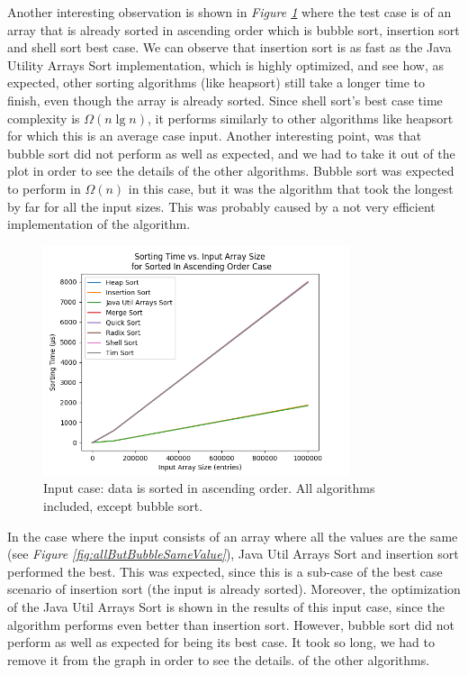 Another interesting observation is shown in \textit{Figure \ref{fig:allButBubbleInAscendingOrder}} where the test case is of an array that is already sorted in ascending order which is bubble sort, insertion sort and shell sort best case. We can observe that insertion sort is as fast as the Java Utility Arrays Sort implementation, which is highly optimized, and see how, as expected, other sorting algorithms (like heapsort) still take a longer time to finish, even though the array is already sorted. Since shell sort's best case time complexity is $\Omega(n \lg n)$, it performs similarly to other algorithms like heapsort for which this is an average case input. Another interesting point, was that bubble sort did not perform as well as expected, and we had to take it out of the plot in order to see the details of the other algorithms. Bubble sort was expected to perform in $\Omega(n)$ in this case, but it was the algorithm that took the longest by far for all the input sizes. This was probably caused by a not very efficient implementation of the algorithm.

\begin{figure}[!ht]
\centering
\includegraphics[width=9cm]{figures/plots_without_BubbleSort/sorting_time_vs_input_array_size_SortedInAscendingOrderCase.png}
\caption{Input case: data is sorted in ascending order. All algorithms included, except bubble sort.}
\label{fig:allButBubbleInAscendingOrder}
\end{figure}

In the case where the input consists of an array where all the values are the same (see \textit{Figure \ref{fig:allButBubbleSameValue}}), Java Util Arrays Sort and insertion sort performed the best. This was expected, since this is a sub-case of the best case scenario of insertion sort (the input is already sorted). Moreover, the optimization of the Java Util Arrays Sort is shown in the results of this input case, since the algorithm performs even better than insertion sort. However, bubble sort did not perform as well as expected for being its best case. It took so long, we had to remove it from the graph in order to see the details. of the other algorithms.


